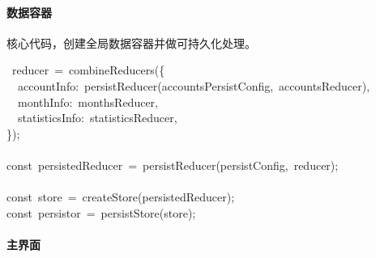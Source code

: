 \documentclass{article}
\begin{document}
\paragraph{数据容器}\label{section}%

\noindent{}核心代码，创建全局数据容器并做可持久化处理。%
\begin{mdpre}%
~reducer~=~combineReducers(\{\\
~~accountInfo:~persistReducer(accountsPersistConfig,~accountsReducer),\\
~~monthInfo:~monthsReducer,\\
~~statisticsInfo:~statisticsReducer,\\
\});\\
\\
{const}~persistedReducer~=~persistReducer(persistConfig,~reducer);\\
\\
{const}~store~=~createStore(persistedReducer);\\
{const}~persistor~=~persistStore(store);%
\end{mdpre}
\paragraph{主界面}\label{section}%
\end{document}
